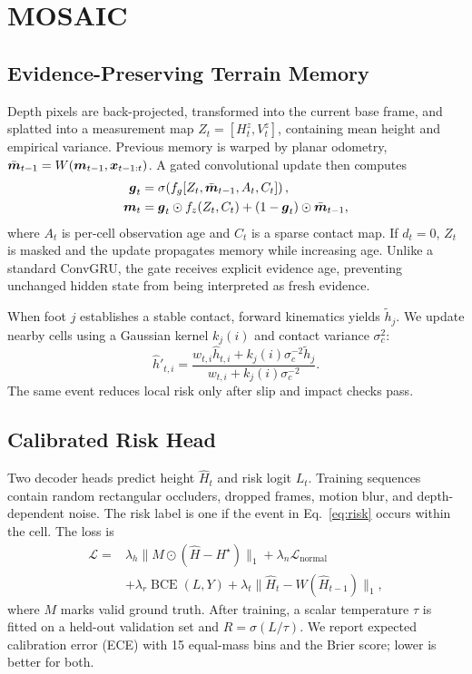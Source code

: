 \section{MOSAIC}

\subsection{Evidence-Preserving Terrain Memory}

Depth pixels are back-projected, transformed into the current base frame, and splatted into
a measurement map $Z_t=[H_t^{z},V_t^{z}]$, containing mean height and empirical variance.
Previous memory is warped by planar odometry, $\bar{\boldsymbol{m}}_{t-1}=W(\boldsymbol{m}_{t-1},
\boldsymbol{x}_{t-1:t})$. A gated convolutional update then computes
\begin{align}
 \boldsymbol{g}_t &= \sigma\!\left(f_g[Z_t,\bar{\boldsymbol{m}}_{t-1},A_t,C_t]\right),\\
 \boldsymbol{m}_t &= \boldsymbol{g}_t\odot f_z(Z_t,C_t)
            +(1-\boldsymbol{g}_t)\odot\bar{\boldsymbol{m}}_{t-1},
 \label{eq:memory}
\end{align}
where $A_t$ is per-cell observation age and $C_t$ is a sparse contact map. If $d_t=0$,
$Z_t$ is masked and the update propagates memory while increasing age. Unlike a standard
ConvGRU, the gate receives explicit evidence age, preventing unchanged hidden state from
being interpreted as fresh evidence.

When foot $j$ establishes a stable contact, forward kinematics yields
$\tilde h_j$. We update nearby cells using a Gaussian kernel $k_j(i)$ and contact variance
$\sigma_c^2$:
\begin{equation}
 \hat h'_{t,i}=\frac{w_{t,i}\hat h_{t,i}+
 k_j(i)\sigma_c^{-2}\tilde h_j}{w_{t,i}+k_j(i)\sigma_c^{-2}}.
 \label{eq:contact}
\end{equation}
The same event reduces local risk only after slip and impact checks pass.

\subsection{Calibrated Risk Head}

Two decoder heads predict height $\hat H_t$ and risk logit $L_t$. Training sequences contain
random rectangular occluders, dropped frames, motion blur, and depth-dependent noise. The
risk label is one if the event in Eq.~\eqref{eq:risk} occurs within the cell. The loss is
\begin{equation}
\begin{aligned}
 \mathcal{L}={}&\lambda_h\lVert M\odot(\hat H-H^\star)\rVert_1
 +\lambda_n\mathcal{L}_{\mathrm{normal}}\\
 &+\lambda_r\operatorname{BCE}(L,Y)
 +\lambda_t\lVert\hat H_t-W(\hat H_{t-1})\rVert_1,
\end{aligned}
 \label{eq:loss}
\end{equation}
where $M$ marks valid ground truth. After training, a scalar temperature $\tau$ is fitted on
a held-out validation set and $R=\sigma(L/\tau)$. We report expected calibration error
(ECE) with 15 equal-mass bins and the Brier score; lower is better for both.

